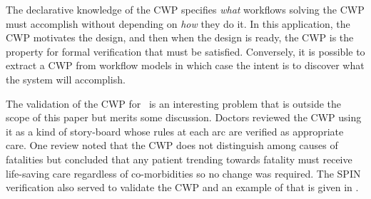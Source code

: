 The declarative knowledge of the CWP specifies \emph{what} workflows solving the CWP must accomplish without depending on \emph{how} they do it. In this application, the CWP motivates the design, and then when the design is ready, the CWP is the property for formal verification that must be satisfied. Conversely, it is possible to extract a CWP from workflow models in which case the intent is to discover what the system will accomplish. 

The validation of the CWP for \phware\ is an interesting problem that is outside the scope of this paper but merits some discussion. Doctors reviewed the CWP using it as a kind of story-board whose rules at each arc are verified as appropriate care. One review noted that the CWP does not distinguish among causes of fatalities but concluded that any patient trending towards fatality must receive life-saving care regardless of co-morbidities so no change was required. The SPIN verification also served to validate the CWP and an example of that is given in .

